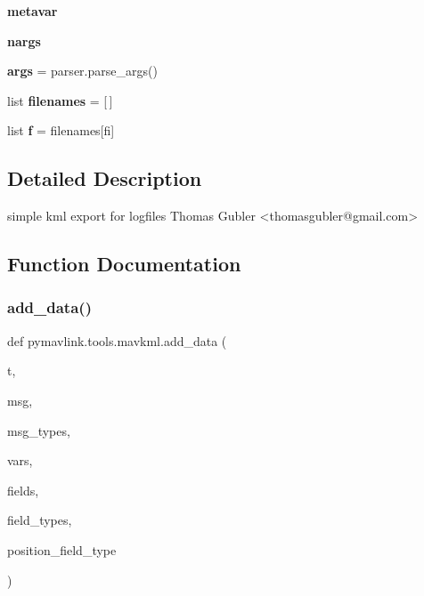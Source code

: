 \begin{DoxyCompactItemize}
{\bfseries metavar}
\item 
\mbox{\label{namespacepymavlink_1_1tools_1_1mavkml_ab8cf8bbb2f7cdfaf6fc4de2ea7136254}} 
{\bfseries nargs}
\item 
\mbox{\label{namespacepymavlink_1_1tools_1_1mavkml_aed6f203ddb846d8e9662684b3f62f48c}} 
{\bfseries args} = parser.\+parse\+\_\+args()
\item 
\mbox{\label{namespacepymavlink_1_1tools_1_1mavkml_a84b6c0ac258ed15dfc8caa95c770475c}} 
list {\bfseries filenames} = \mbox{[}$\,$\mbox{]}
\item 
\mbox{\label{namespacepymavlink_1_1tools_1_1mavkml_a66015ffc8eb20197077dd017941da065}} 
list {\bfseries f} = filenames\mbox{[}fi\mbox{]}
\end{DoxyCompactItemize}


\subsection{Detailed Description}
\begin{DoxyVerb}simple kml export for logfiles
Thomas Gubler <thomasgubler@gmail.com>
\end{DoxyVerb}
 

\subsection{Function Documentation}
\mbox{\label{namespacepymavlink_1_1tools_1_1mavkml_a356af6d8a50929dbc97b578a26b02c89}} 
\subsubsection{\texorpdfstring{add\+\_\+data()}{add\_data()}}
{\footnotesize\ttfamily def pymavlink.\+tools.\+mavkml.\+add\+\_\+data (\begin{DoxyParamCaption}\item[{}]{t,  }\item[{}]{msg,  }\item[{}]{msg\+\_\+types,  }\item[{}]{vars,  }\item[{}]{fields,  }\item[{}]{field\+\_\+types,  }\item[{}]{position\+\_\+field\+\_\+type }\end{DoxyParamCaption})}

